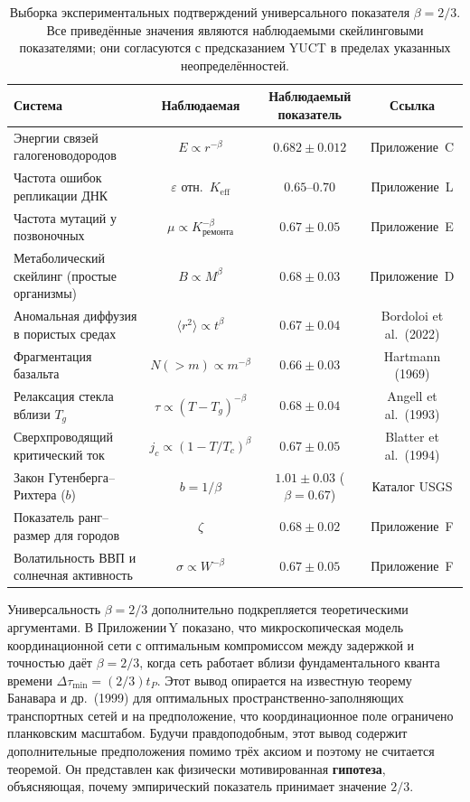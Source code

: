 \documentclass[11pt,a4paper]{article}
\begin{document}
	\begin{table}[htbp]
		\centering
		\caption{Выборка экспериментальных подтверждений универсального показателя \(\beta = 2/3\).  Все приведённые значения являются наблюдаемыми скейлинговыми показателями; они согласуются с предсказанием YUCT в пределах указанных неопределённостей.}
		\label{tab:beta-evidence}
		\small
		\begin{tabular}{l c c c}
			\toprule
			\textbf{Система} & \textbf{Наблюдаемая} & \textbf{Наблюдаемый показатель} & \textbf{Ссылка} \\
			\midrule
			Энергии связей галогеноводородов & \(E \propto r^{-\beta}\) & \(0.682 \pm 0.012\) & Приложение~C \\
			Частота ошибок репликации ДНК & \(\varepsilon\) отн.\ \(K_{\mathrm{eff}}\) & \(0.65\text{--}0.70\) & Приложение~L \\
			Частота мутаций у позвоночных & \(\mu \propto K_{\mathrm{ремонта}}^{-\beta}\) & \(0.67 \pm 0.05\) & Приложение~E \\
			Метаболический скейлинг (простые организмы) & \(B \propto M^{\beta}\) & \(0.68 \pm 0.03\) & Приложение~D \\
			Аномальная диффузия в пористых средах & \(\langle r^2 \rangle \propto t^{\beta}\) & \(0.67 \pm 0.04\) & Bordoloi et al.\ (2022) \\
			Фрагментация базальта & \(N(>m) \propto m^{-\beta}\) & \(0.66 \pm 0.03\) & Hartmann (1969) \\
			Релаксация стекла вблизи \(T_g\) & \(\tau \propto (T-T_g)^{-\beta}\) & \(0.68 \pm 0.04\) & Angell et al.\ (1993) \\
			Сверхпроводящий критический ток & \(j_c \propto (1-T/T_c)^{\beta}\) & \(0.67 \pm 0.05\) & Blatter et al.\ (1994) \\
			Закон Гутенберга–Рихтера (\(b\)) & \(b = 1/\beta\) & \(1.01 \pm 0.03\) (\(\beta=0.67\)) & Каталог USGS \\
			Показатель ранг–размер для городов & \(\zeta\) & \(0.68 \pm 0.02\) & Приложение~F \\
			Волатильность ВВП и солнечная активность & \(\sigma \propto W^{-\beta}\) & \(0.67 \pm 0.05\) & Приложение~F \\
			\bottomrule
		\end{tabular}
	\end{table}
	
	Универсальность \(\beta = 2/3\) дополнительно подкрепляется теоретическими аргументами.  В Приложении Y показано, что микроскопическая модель координационной сети с оптимальным компромиссом между задержкой и точностью даёт \(\beta = 2/3\), когда сеть работает вблизи фундаментального кванта времени \(\Delta\tau_{\min} = (2/3) t_P\).  Этот вывод опирается на известную теорему Банавара и др.\ (1999) для оптимальных пространственно-заполняющих транспортных сетей и на предположение, что координационное поле ограничено планковским масштабом.  Будучи правдоподобным, этот вывод содержит дополнительные предположения помимо трёх аксиом и поэтому не считается теоремой.  Он представлен как физически мотивированная \textbf{гипотеза}, объясняющая, почему эмпирический показатель принимает значение \(2/3\).
	
\end{document}
